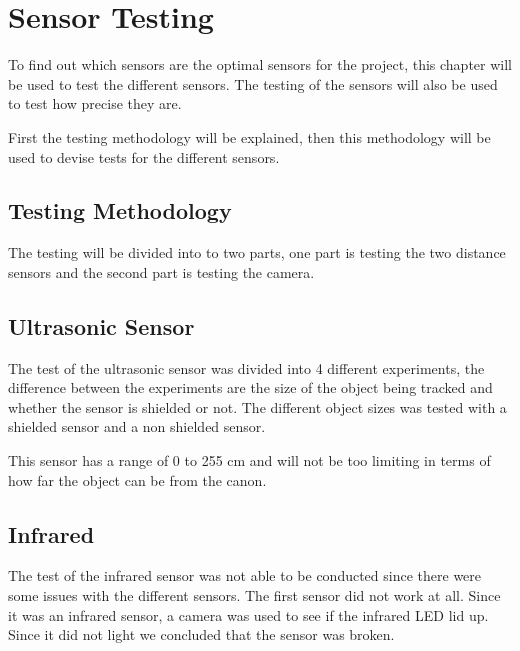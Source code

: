 \section{Sensor Testing}
To find out which sensors are the optimal sensors for the project,
this chapter will be used to test the different sensors. The testing of the
sensors will also be used to test how precise they are.\nl

First the testing methodology will be explained, then this methodology
will be used to devise tests for the different sensors. 

\subsection{Testing Methodology}
The testing will be divided into to two parts, one part is testing the two
distance sensors and the second part is testing the camera. 

\subsection{Ultrasonic Sensor}
The test of the ultrasonic sensor was divided into 4 different experiments, the
difference between the experiments are the size of the object being tracked and
whether the sensor is shielded or not. The different object sizes was tested
with a shielded sensor and a non shielded sensor. \nl


This sensor has a range of 0 to 255 cm and will not be too limiting in terms of
how far the object can be from the canon. 

\subsection{Infrared}
The test of the infrared sensor was not able to be conducted since there were
some issues with the different sensors. The first sensor did not work at all.
Since it was an infrared sensor, a camera was used to see if the infrared
LED lid up. Since it did not light we concluded that the sensor was broken. \nl

